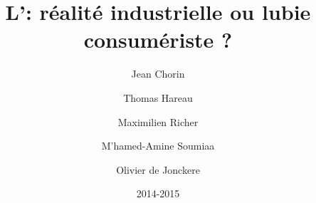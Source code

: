 \documentclass{monographie}
\title{L'\OP : réalité industrielle ou lubie consumériste ?}
\author{Jean Chorin \and Thomas Hareau \and Maximilien Richer	 \and M'hamed-Amine Soumiaa \and Olivier de Jonckere}
\date{2014-2015}
\begin{document}
\maketitle

\tableofcontents


	
		
		
		
	
		
		
			
	
		
		
		

	
		
		
		
	
		
		
			
	
		
		
		

	
		
		
		
	
		
		
			
	
		
		
		


\appendix




\begin{small}

\printbibliography
\end{small}

\end{document}
